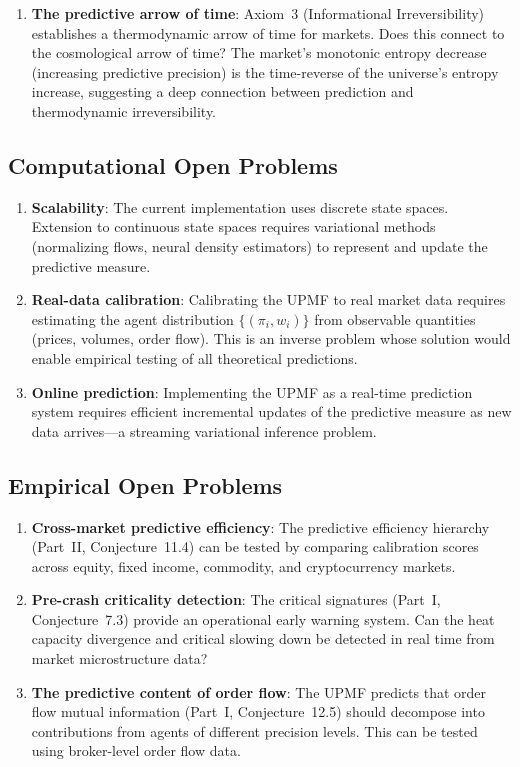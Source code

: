 \documentclass[12pt,a4paper]{article}
\theoremstyle{definition}
\begin{document}
\begin{enumerate}
    \item \textbf{The predictive arrow of time}: Axiom~3 (Informational Irreversibility) establishes a thermodynamic arrow of time for markets. Does this connect to the cosmological arrow of time? The market's monotonic entropy decrease (increasing predictive precision) is the time-reverse of the universe's entropy increase, suggesting a deep connection between prediction and thermodynamic irreversibility.
\end{enumerate}

\subsection{Computational Open Problems}

\begin{enumerate}
    \item \textbf{Scalability}: The current implementation uses discrete state spaces. Extension to continuous state spaces requires variational methods (normalizing flows, neural density estimators) to represent and update the predictive measure.
    
    \item \textbf{Real-data calibration}: Calibrating the UPMF to real market data requires estimating the agent distribution $\{(\pi_i, w_i)\}$ from observable quantities (prices, volumes, order flow). This is an inverse problem whose solution would enable empirical testing of all theoretical predictions.
    
    \item \textbf{Online prediction}: Implementing the UPMF as a real-time prediction system requires efficient incremental updates of the predictive measure as new data arrives---a streaming variational inference problem.
\end{enumerate}

\subsection{Empirical Open Problems}

\begin{enumerate}
    \item \textbf{Cross-market predictive efficiency}: The predictive efficiency hierarchy (Part~II, Conjecture~11.4) can be tested by comparing calibration scores across equity, fixed income, commodity, and cryptocurrency markets.
    
    \item \textbf{Pre-crash criticality detection}: The critical signatures (Part~I, Conjecture~7.3) provide an operational early warning system. Can the heat capacity divergence and critical slowing down be detected in real time from market microstructure data?
    
    \item \textbf{The predictive content of order flow}: The UPMF predicts that order flow mutual information (Part~I, Conjecture~12.5) should decompose into contributions from agents of different precision levels. This can be tested using broker-level order flow data.
\end{enumerate}
\end{document}
